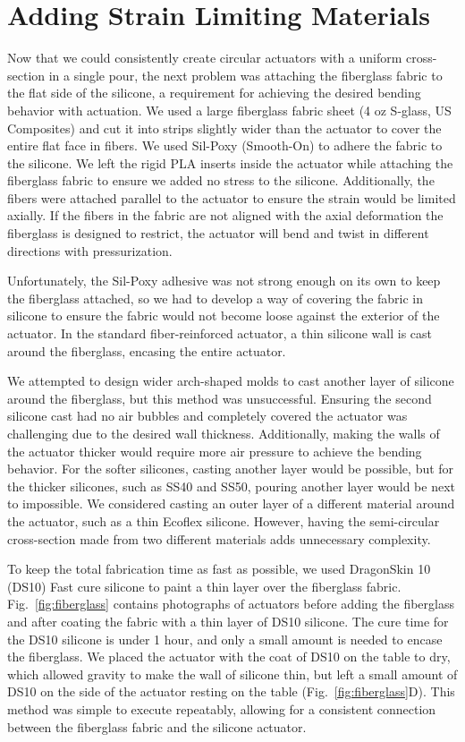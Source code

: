 \clearpage
\section{Adding Strain Limiting Materials}

Now that we could consistently create circular actuators with a uniform cross-section in a single pour, the next problem was attaching the fiberglass fabric to the flat side of the silicone, a requirement for achieving the desired bending behavior with actuation. We used a large fiberglass fabric sheet (4 oz S-glass, US Composites) and cut it into strips slightly wider than the actuator to cover the entire flat face in fibers. We used Sil-Poxy (Smooth-On) to adhere the fabric to the silicone. We left the rigid PLA inserts inside the actuator while attaching the fiberglass fabric to ensure we added no stress to the silicone. Additionally, the fibers were attached parallel to the actuator to ensure the strain would be limited axially. If the fibers in the fabric are not aligned with the axial deformation the fiberglass is designed to restrict, the actuator will bend and twist in different directions with pressurization. 

Unfortunately, the Sil-Poxy adhesive was not strong enough on its own to keep the fiberglass attached, so we had to develop a way of covering the fabric in silicone to ensure the fabric would not become loose against the exterior of the actuator. In the standard fiber-reinforced actuator, a thin silicone wall is cast around the fiberglass, encasing the entire actuator. 

We attempted to design wider arch-shaped molds to cast another layer of silicone around the fiberglass, but this method was unsuccessful. Ensuring the second silicone cast had no air bubbles and completely covered the actuator was challenging due to the desired wall thickness. Additionally, making the walls of the actuator thicker would require more air pressure to achieve the bending behavior. For the softer silicones, casting another layer would be possible, but for the thicker silicones, such as SS40 and SS50, pouring another layer would be next to impossible. We considered casting an outer layer of a different material around the actuator, such as a thin Ecoflex silicone. However, having the semi-circular cross-section made from two different materials adds unnecessary complexity. 

To keep the total fabrication time as fast as possible, we used DragonSkin 10 (DS10) Fast cure silicone to paint a thin layer over the fiberglass fabric. Fig.~\ref{fig:fiberglass} contains photographs of actuators before adding the fiberglass and after coating the fabric with a thin layer of DS10 silicone. The cure time for the DS10 silicone is under 1 hour, and only a small amount is needed to encase the fiberglass. We placed the actuator with the coat of DS10 on the table to dry, which allowed gravity to make the wall of silicone thin, but left a small amount of DS10 on the side of the actuator resting on the table (Fig.~\ref{fig:fiberglass}D). This method was simple to execute repeatably, allowing for a consistent connection between the fiberglass fabric and the silicone actuator. \\

